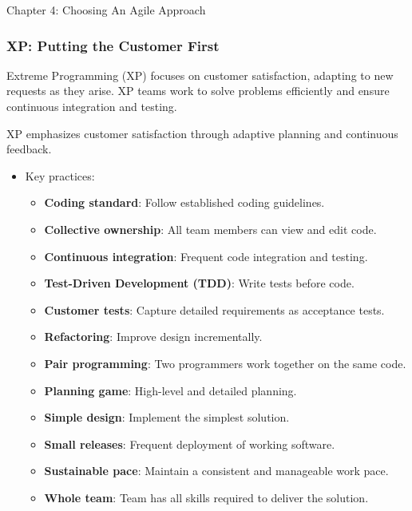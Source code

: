 \begin{notes}{Chapter 4: Choosing An Agile Approach}
\begin{highlight}
    \end{highlight}
    
    \subsubsection*{XP: Putting the Customer First}
    
    Extreme Programming (XP) focuses on customer satisfaction, adapting to new requests as they arise. XP teams work to solve problems efficiently and ensure continuous integration and testing.
    
    \begin{highlight}
    
        XP emphasizes customer satisfaction through adaptive planning and continuous feedback.
        
        \begin{itemize}
            \item Key practices:
            \begin{itemize}
                \item \textbf{Coding standard}: Follow established coding guidelines.
                \item \textbf{Collective ownership}: All team members can view and edit code.
                \item \textbf{Continuous integration}: Frequent code integration and testing.
                \item \textbf{Test-Driven Development (TDD)}: Write tests before code.
                \item \textbf{Customer tests}: Capture detailed requirements as acceptance tests.
                \item \textbf{Refactoring}: Improve design incrementally.
                \item \textbf{Pair programming}: Two programmers work together on the same code.
                \item \textbf{Planning game}: High-level and detailed planning.
                \item \textbf{Simple design}: Implement the simplest solution.
                \item \textbf{Small releases}: Frequent deployment of working software.
                \item \textbf{Sustainable pace}: Maintain a consistent and manageable work pace.
                \item \textbf{Whole team}: Team has all skills required to deliver the solution.
            \end{itemize}
        \end{itemize}
    

\end{highlight}
\end{notes}
